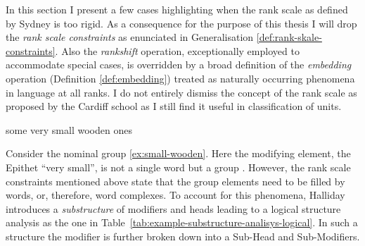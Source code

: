    In this section I present a few cases highlighting when the rank scale as defined by Sydney is too rigid. As a consequence for the purpose of this thesis I will drop the \textit{rank scale constraints} as enunciated in Generalisation \ref{def:rank-skale-constraints}. Also the \textit{rankshift} operation, exceptionally employed to accommodate special cases, is overridden by a broad definition of the \textit{embedding}  operation (Definition \ref{def:embedding}) treated as naturally occurring phenomena in language at all ranks. I do not entirely dismiss the concept of the rank scale as proposed by the Cardiff school as I still find it useful in classification of units.
    
    
    \begin{exe}
        \ex \label{ex:small-wooden} some very small wooden ones
    \end{exe}
    
    Consider the nominal group \ref{ex:small-wooden}. Here the modifying element, the Epithet ``very small'', is not a single word but a group \citep[390--396]{Halliday2013}. However, the rank scale constraints mentioned above state that the group elements need to be filled by words, or, therefore, word complexes. To account for this phenomena, Halliday introduces a \textit{substructure} of modifiers and heads leading to a logical structure analysis as the one in \mbox{Table \ref{tab:example-substructure-analisys-logical}}. In such a structure the modifier is further broken down into a Sub-Head and Sub-Modifiers. 
    
